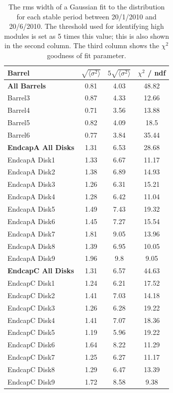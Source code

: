 \begin{table}[h]
 \centering
\begin{tabular}{ l | c | c | c }
\hline\hline
Barrel & $\sqrt{\langle \sigma ^ 2 \rangle }$ & $5\sqrt{\langle \sigma ^ 2 \rangle }$ & $\chi ^2$  / ndf\\
\hline
\textbf{All Barrels} & 0.81 & 4.03 & 48.82 \\
Barrel3 & 0.87 & 4.33 & 12.66 \\
Barrel4 & 0.71 & 3.56 & 13.88 \\
Barrel5 & 0.82 & 4.09 & 18.5 \\
Barrel6 & 0.77 & 3.84 & 35.44 \\
\hline
\textbf{EndcapA All Disks} & 1.31 & 6.53 & 28.68 \\
EndcapA Disk1 & 1.33 & 6.67 & 11.17 \\
EndcapA Disk2 & 1.38 & 6.89 & 14.93 \\
EndcapA Disk3 & 1.26 & 6.31 & 15.21 \\
EndcapA Disk4 & 1.28 & 6.42 & 11.04 \\
EndcapA Disk5 & 1.49 & 7.43 & 19.32 \\
EndcapA Disk6 & 1.45 & 7.27 & 15.54 \\
EndcapA Disk7 & 1.81 & 9.05 & 13.96 \\
EndcapA Disk8 & 1.39 & 6.95 & 10.05 \\
EndcapA Disk9 & 1.96 & 9.8 & 9.05 \\
\hline
\textbf{EndcapC All Disks} & 1.31 & 6.57 & 44.63 \\
EndcapC Disk1 & 1.24 & 6.21 & 17.52 \\
EndcapC Disk2 & 1.41 & 7.03 & 14.18 \\
EndcapC Disk3 & 1.26 & 6.28 & 19.22 \\
EndcapC Disk4 & 1.41 & 7.07 & 18.36 \\
EndcapC Disk5 & 1.19 & 5.96 & 19.22 \\
EndcapC Disk6 & 1.64 & 8.22 & 11.29 \\
EndcapC Disk7 & 1.25 & 6.27 & 11.17 \\
EndcapC Disk8 & 1.29 & 6.47 & 13.39 \\
EndcapC Disk9 & 1.72 & 8.58 & 9.38 \\
\hline\hline
\end{tabular}
\caption{The rms width of a Gaussian fit to the \tdiff distribution for each stable period between 20/1/2010 and 20/6/2010. The threshold used for identifying high \tdiff modules is set as 5 times this value; this is also shown in the second column. The third column shows the $\chi^2$ goodness of fit parameter.}
\label{table:tdiff_thresh}
\end{table}

